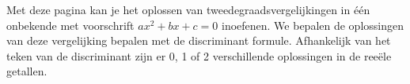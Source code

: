\documentclass{ximera}
\begin{document}
	\author{Wiskunde Op Maat}




 Met deze pagina kan je het oplossen van tweedegraadsvergelijkingen in één onbekende met voorschrift \( ax^2+bx+c=0 \) inoefenen.  
 We bepalen de oplossingen van deze vergelijking bepalen met de discriminant formule. 
 Afhankelijk van het teken van de discriminant zijn er 0, 1 of 2 verschillende oplossingen in de reeële getallen. 


\newcommand{\choicetwee}{{\wordChoice{\choice[correct]{twee}\choice{één}\choice{geen}}}}
\newcommand{\choiceeen}{{\wordChoice{\choice{twee}\choice[correct]{één}\choice{geen}}}}
\newcommand{\choicegeen}{{\wordChoice{\choice{twee}\choice]{één}\choice[correct]{geen}}}}

\newcommand{\choicepositief}{{\wordChoice{\choice[correct]{positief}\choice{nul}\choice{negatief}}}}
\newcommand{\choicenul}{{\wordChoice{\choice{positief}\choice[correct]{nul}\choice{negatief}}}}
\newcommand{\choicenegatief}{{\wordChoice{\choice{positief}\choice]{nul}\choice[correct]{negatief}}}}
 
\end{document}
